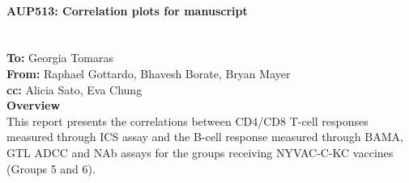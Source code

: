\documentclass[11pt]{article}\usepackage[]{graphicx}\usepackage[]{color}
\renewcommand{\headrulewidth}{0.0pt}
\renewcommand{\footrulewidth}{0.0pt}}
\renewcommand{\headrulewidth}{0.4pt}
\renewcommand{\footrulewidth}{0.4pt}
\renewcommand{\headrulewidth}{0.8pt}
\renewcommand{\footrulewidth}{0.8pt}
\begin{document}
\newcommand{\tab}{\hspace*{2cm}} %
\newcommand{\bat}{\vspace*{2pc}} %
\textnormal {\normalfont}
\makeatletter
\let\insertdate\@date
\makeatother

\bat
\Large \textbf{\\ AUP513: Correlation plots for manuscript} \\
\large
\insertdate \\ \\
\textbf{To:} Georgia Tomaras \\
\textbf{From:} Raphael Gottardo, Bhavesh Borate, Bryan Mayer \\
\textbf{cc:} Alicia Sato, Eva Chung \\

\normalsize
\textbf{Overview} \\
This report presents the correlations between CD4/CD8 T-cell responses measured through ICS assay and the B-cell response measured through BAMA, GTL ADCC and NAb assays for the groups receiving NYVAC-C-KC vaccines (Groups 5 and 6). 

\listoffigures


\newpage
\makeatletter
\patchcmd{\@fancyhead}{\rlap}{\color{gray}\rlap}{}{}
\patchcmd{\headrule}{\hrule}{\color{gray}\hrule}{}{}
\patchcmd{\@fancyfoot}{\rlap}{\color{gray}\rlap}{}{}
\patchcmd{\footrule}{\hrule}{\color{gray}\hrule}{}{}
\makeatother
\newpage
{}
\renewcommand{\headrulewidth}{0.4pt}
\renewcommand{\footrulewidth}{0.4pt}
\fancyhead[L]{}


\end{document}
